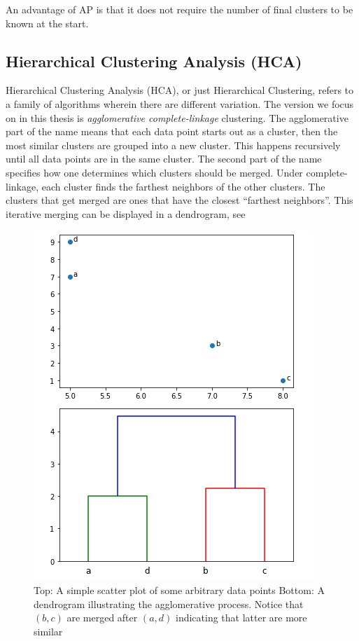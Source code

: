 An advantage of AP is that it does not require the number of final clusters to be known at the start.  

 
 \subsection{Hierarchical Clustering Analysis (HCA)}
 Hierarchical Clustering Analysis (HCA), or just Hierarchical Clustering, refers to a family of algorithms wherein there are different variation\cite{78-Lesson10}. The version we focus on in this thesis is \textit{agglomerative complete-linkage} clustering. 
The agglomerative part of the name means that each data point starts out as a cluster, then the most similar clusters are grouped into a new cluster. 
This happens recursively until all data points are in the same cluster.
The second part of the name specifies how one determines which clusters should be merged. 
Under complete-linkage, each cluster finds the farthest neighbors of the other clusters. The clusters that get merged are ones that have the closest “farthest neighbors”.
This iterative merging can be displayed in a dendrogram, see 


\begin{figure}[t]
  \centering
  \includegraphics[width=.6\linewidth]{figs/deno/toy-dendrogram.png}
  \caption{Top: A simple scatter plot of some arbitrary data points 
  \newline Bottom: A dendrogram illustrating the agglomerative process. 
  \newline Notice that $(b,c)$ are merged after $(a,d)$ indicating that latter are more similar}
  \label{fig:toy-dendrogram}
\end{figure}

